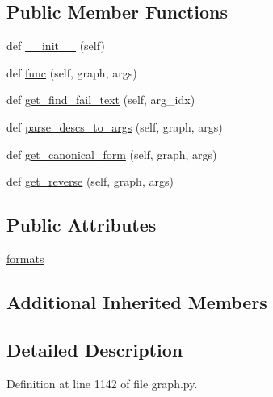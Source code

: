 \subsection*{Public Member Functions}
\begin{DoxyCompactItemize}
\item 
def \hyperlink{classlight__chats_1_1graph_1_1GetObjectFunction_a77ef8fd9dd23fae23a1cb61fb0ebeca1}{\+\_\+\+\_\+init\+\_\+\+\_\+} (self)
\item 
def \hyperlink{classlight__chats_1_1graph_1_1GetObjectFunction_a36f3c298e8ac89d67ae856306d42a22d}{func} (self, graph, args)
\item 
def \hyperlink{classlight__chats_1_1graph_1_1GetObjectFunction_a257db456e6c73645523f4ad9bd5ff918}{get\+\_\+find\+\_\+fail\+\_\+text} (self, arg\+\_\+idx)
\item 
def \hyperlink{classlight__chats_1_1graph_1_1GetObjectFunction_a2854af16c5150dcd6a39176fefc3d536}{parse\+\_\+descs\+\_\+to\+\_\+args} (self, graph, args)
\item 
def \hyperlink{classlight__chats_1_1graph_1_1GetObjectFunction_a95528a5a8694228805bad940519e6e0e}{get\+\_\+canonical\+\_\+form} (self, graph, args)
\item 
def \hyperlink{classlight__chats_1_1graph_1_1GetObjectFunction_abf058d18fba80c7d17fc0d3ce8edbc72}{get\+\_\+reverse} (self, graph, args)
\end{DoxyCompactItemize}
\subsection*{Public Attributes}
\begin{DoxyCompactItemize}
\item 
\hyperlink{classlight__chats_1_1graph_1_1GetObjectFunction_a726f8b3315bfedc530da445bb3e135e6}{formats}
\end{DoxyCompactItemize}
\subsection*{Additional Inherited Members}


\subsection{Detailed Description}
\begin{DoxyVerb}\end{DoxyVerb}
 

Definition at line 1142 of file graph.\+py.



